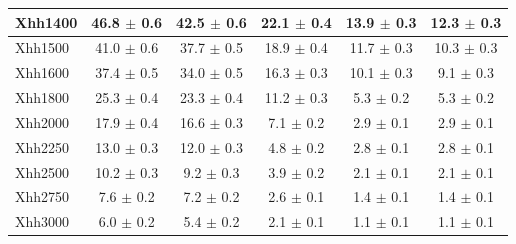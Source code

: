 \begin{center}
\begin{table}
\begin{tabular}{l|c|c|c|c|c}
Xhh1400 	& 46.8 $\pm$ 0.6 	& 42.5 $\pm$ 0.6 	& 22.1 $\pm$ 0.4 	& 13.9 $\pm$ 0.3 	& 12.3 $\pm$ 0.3	\\\hline 
Xhh1500 	& 41.0 $\pm$ 0.6 	& 37.7 $\pm$ 0.5 	& 18.9 $\pm$ 0.4 	& 11.7 $\pm$ 0.3 	& 10.3 $\pm$ 0.3	\\\hline 
Xhh1600 	& 37.4 $\pm$ 0.5 	& 34.0 $\pm$ 0.5 	& 16.3 $\pm$ 0.3 	& 10.1 $\pm$ 0.3 	& 9.1 $\pm$ 0.3	\\\hline 
Xhh1800 	& 25.3 $\pm$ 0.4 	& 23.3 $\pm$ 0.4 	& 11.2 $\pm$ 0.3 	& 5.3 $\pm$ 0.2 	& 5.3 $\pm$ 0.2	\\\hline 
Xhh2000 	& 17.9 $\pm$ 0.4 	& 16.6 $\pm$ 0.3 	& 7.1 $\pm$ 0.2 	& 2.9 $\pm$ 0.1 	& 2.9 $\pm$ 0.1	\\\hline 
Xhh2250 	& 13.0 $\pm$ 0.3 	& 12.0 $\pm$ 0.3 	& 4.8 $\pm$ 0.2 	& 2.8 $\pm$ 0.1 	& 2.8 $\pm$ 0.1	\\\hline 
Xhh2500 	& 10.2 $\pm$ 0.3 	& 9.2 $\pm$ 0.3 	& 3.9 $\pm$ 0.2 	& 2.1 $\pm$ 0.1 	& 2.1 $\pm$ 0.1	\\\hline 
Xhh2750 	& 7.6 $\pm$ 0.2 	& 7.2 $\pm$ 0.2 	& 2.6 $\pm$ 0.1 	& 1.4 $\pm$ 0.1 	& 1.4 $\pm$ 0.1	\\\hline 
Xhh3000 	& 6.0 $\pm$ 0.2 	& 5.4 $\pm$ 0.2 	& 2.1 $\pm$ 0.1 	& 1.1 $\pm$ 0.1 	& 1.1 $\pm$ 0.1	\\\hline 
\hline
\end{tabular}
\end{table}


\end{center}
